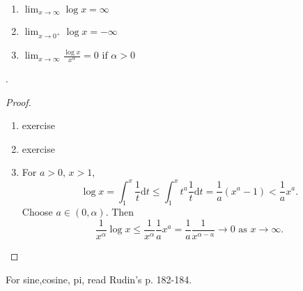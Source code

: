 \begin{thm}
	\begin{enumerate}
		\item $\lim_{x\to \infty}{\log{x}}=\infty$
		\item $\lim_{x\to 0^{+}}{\log{x}}=-\infty$
		\item $\lim_{x\to \infty}{ \frac{\log{x}}{x^{\alpha}}}=0 \text{ if }  \alpha>0$
	\end{enumerate}.
	\begin{proof}
		\begin{enumerate}
			\item exercise
			\item exercise
			\item For $a>0$, $x>1$, \[
				      \log{x}= \int_{1}^{x}{\frac{1}{t}\mathrm{d}t}\le \int_{1}^{x}{t^{a} \frac{1}{t}\mathrm{d}t}=\frac{1}{a}(x^{a}-1)<\frac{1}{a}x^{a}
				      .\]
			      Choose $a \in (0, \alpha)$. Then \[
				      \frac{1}{x^{\alpha}} \log{x}\le \frac{1}{x^{\alpha}}\frac{1}{a}x^{a} =\frac{1}{a} \frac{1}{x^{\alpha-a}}\to 0 \text{ as } x\to \infty
				      .\]
		\end{enumerate}
	\end{proof}
\end{thm}
For sine,cosine, pi, read Rudin's p. 182-184.

